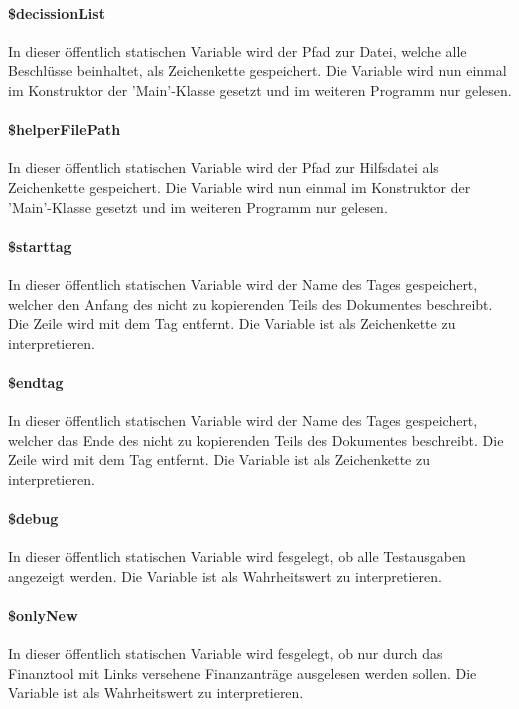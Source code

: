 \documentclass[12pt,parskip=full, pagea4]{scrreprt}
\begin{document}
	\paragraph{\$decissionList} In dieser öffentlich statischen Variable wird der Pfad zur Datei, welche alle Beschlüsse beinhaltet, als Zeichenkette gespeichert. Die Variable wird nun einmal im Konstruktor der 'Main'-Klasse gesetzt und im weiteren Programm nur gelesen.
	
	\paragraph{\$helperFilePath} In dieser öffentlich statischen Variable wird der Pfad zur Hilfsdatei als Zeichenkette gespeichert. Die Variable wird nun einmal im Konstruktor der 'Main'-Klasse gesetzt und im weiteren Programm nur gelesen.
	
	\paragraph{\$starttag} In dieser öffentlich statischen Variable wird der Name des Tages gespeichert, welcher den Anfang des nicht zu kopierenden Teils des Dokumentes beschreibt. Die Zeile wird mit dem Tag entfernt. Die Variable ist als Zeichenkette zu interpretieren.
	
	\paragraph{\$endtag} In dieser öffentlich statischen Variable wird der Name des Tages gespeichert, welcher das Ende des nicht zu kopierenden Teils des Dokumentes beschreibt. Die Zeile wird mit dem Tag entfernt. Die Variable ist als Zeichenkette zu interpretieren.
	
	\paragraph{\$debug} In dieser öffentlich statischen Variable wird fesgelegt, ob alle Testausgaben angezeigt werden. Die Variable ist als Wahrheitswert zu interpretieren.
	
	\paragraph{\$onlyNew} In dieser öffentlich statischen Variable wird fesgelegt, ob nur durch das Finanztool mit Links versehene Finanzanträge ausgelesen werden sollen. Die Variable ist als Wahrheitswert zu interpretieren.
	
\end{document}
